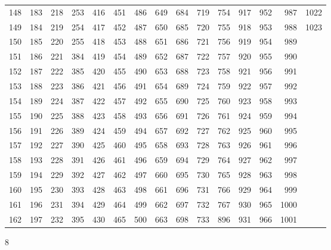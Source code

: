 \documentclass{assignment}
\begin{document}
\begin{tabular}{r r r r r r r r r r r r r r r}
148 & 183 & 218 & 253 & 416 & 451 & 486 & 649 & 684 & 719 & 754 & 917 & 952 & 987 & 1022 \\
149 & 184 & 219 & 254 & 417 & 452 & 487 & 650 & 685 & 720 & 755 & 918 & 953 & 988 & 1023 \\
150 & 185 & 220 & 255 & 418 & 453 & 488 & 651 & 686 & 721 & 756 & 919 & 954 & 989 \\
151 & 186 & 221 & 384 & 419 & 454 & 489 & 652 & 687 & 722 & 757 & 920 & 955 & 990 \\
152 & 187 & 222 & 385 & 420 & 455 & 490 & 653 & 688 & 723 & 758 & 921 & 956 & 991 \\
153 & 188 & 223 & 386 & 421 & 456 & 491 & 654 & 689 & 724 & 759 & 922 & 957 & 992 \\
154 & 189 & 224 & 387 & 422 & 457 & 492 & 655 & 690 & 725 & 760 & 923 & 958 & 993 \\
155 & 190 & 225 & 388 & 423 & 458 & 493 & 656 & 691 & 726 & 761 & 924 & 959 & 994 \\
156 & 191 & 226 & 389 & 424 & 459 & 494 & 657 & 692 & 727 & 762 & 925 & 960 & 995 \\
157 & 192 & 227 & 390 & 425 & 460 & 495 & 658 & 693 & 728 & 763 & 926 & 961 & 996 \\
158 & 193 & 228 & 391 & 426 & 461 & 496 & 659 & 694 & 729 & 764 & 927 & 962 & 997 \\
159 & 194 & 229 & 392 & 427 & 462 & 497 & 660 & 695 & 730 & 765 & 928 & 963 & 998 \\
160 & 195 & 230 & 393 & 428 & 463 & 498 & 661 & 696 & 731 & 766 & 929 & 964 & 999 \\
161 & 196 & 231 & 394 & 429 & 464 & 499 & 662 & 697 & 732 & 767 & 930 & 965 & 1000 \\
162 & 197 & 232 & 395 & 430 & 465 & 500 & 663 & 698 & 733 & 896 & 931 & 966 & 1001 \\
\end{tabular}
\newpage


8\\
\\
\end{document}

